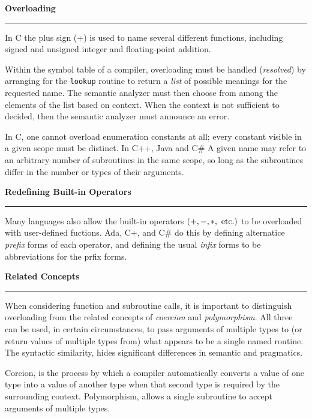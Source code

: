 \nopagenumbers
{\bf Overloading}
\vskip 1mm
\hrule

\vskip 6pt
In C the plus sign (+) is used to name several different functions, including signed and unsigned integer and floating-point addition.

\vskip 6pt
Within the symbol table of a compiler, overloading must be handled ({\it resolved}) by arranging for the {\tt lookup} routine to return a {\it list} of possible meanings for the requested name. The semantic analyzer must then choose from among the elements of the list based on context. When the context is not sufficient to decided, then the semantic analyzer must announce an error.

\vskip 6pt
In C, one cannot overload enumeration constants at all; every constant visible in a given scope must be distinct. In C++, Java and C$\#$ A given name may refer to an arbitrary number of subroutines in the same scope, so long as the subroutines differ in the number or types of their arguments.

\vskip 12pt
{\bf Redefining Built-in Operators}
\vskip 1mm
\hrule

\vskip 6pt
Many languages also allow the built-in operators $(+,-,*,\hbox{ etc.})$ to be overloaded with user-defined fuctions. Ada, C+, and C$\#$ do this by defining alternatice {\it prefix} forms of each operator, and defining the usual {\it infix} forms to be abbreviations for the prfix forms.

\vskip 12pt
{\bf Related Concepts}
\vskip 1mm
\hrule

\vskip 6pt
When considering function and subroutine calls, it is important to distinguish overloading from the related concepts of {\it coercion} and {\it polymorphism}. All three can be used, in certain circumstances, to pass arguments of multiple types to (or return values of multiple types from) what appears to be a single named routine. The syntactic similarity, hides significant differences in semantic and pragmatics.

\vskip 6pt
Corcion, is the process by which a compiler automatically converts a value of one type into a value of another type when that second type is required by the surrounding context. Polymorphism, allows a single subroutine to accept arguments of multiple types.

\vfill\eject
\bye
